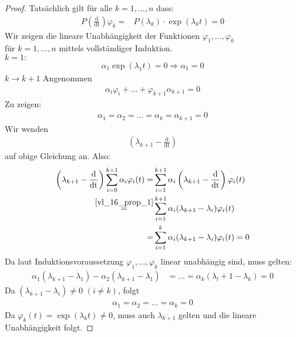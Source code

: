 \begin{proof}
	Tatsächlich gilt für alle $k = 1, \hdots, n $ dass: 
	\begin{align*}
		P \left(\frac{\mathrm{d}}{\mathrm{dt}}\right) \varphi_k = &
			P(\lambda_k)  \cdot \exp(\lambda_k t) = 0
	\end{align*}
	Wir zeigen die lineare Unabhängigkeit der Funktionen $\varphi_1, \hdots, 
	\varphi_k$ \\ für $k = 1, \hdots, n$ mittels vollständiger Induktion. \\
	\emph{$k=1:$} 
	\begin{align*}
		\alpha_1\exp(\lambda_1t) = 0 \Rightarrow \alpha_1 = 0
	\end{align*}
	\emph{$k \rightarrow k+1$} Angenommen
	\begin{align*}
		\alpha_i \varphi_i + \hdots + \varphi_{k+1} \alpha_{k+1} = 0
	\end{align*}
	Zu zeigen: 
	\begin{align*}
		\alpha_1 = \alpha_2 = \hdots = \alpha_k = \alpha_{k+1} = 0
	\end{align*}		
	Wir wenden
	\begin{align*}
		(\lambda_{k+1} - \frac{\mathrm{d}}{\mathrm{dt}})
	\end{align*} auf obige Gleichung an.
	Also: 
	\begin{align*}
		\left(\lambda_{k+1}-\frac{\mathrm{d}}{\mathrm{dt}}\right) 
			\sum_{i=0}^{k+1} \alpha_i \varphi_i(t) 
		= & \sum_{i=1}^{k+1} \alpha_i \left( \lambda_{k+1} - 
			\frac{\mathrm{d}}{\mathrm{dt}} \right) \varphi_i(t) \\ 
		\overset{\ref{vl_16_prop_1}}{=} & \sum_{i=1}^{k+1} \alpha_i (\lambda_{k+1} - \lambda_i) 
			\varphi_i(t) \\
		= & \sum_{i = 1}^k \alpha_i(\lambda_{k+1} - \lambda_i) \varphi_i(t) 
	= 0
	\end{align*}
	Da laut Induktionsvoraussetzung $\varphi_1, \hdots, \varphi_k$ linear 
	unabhängig sind, muss gelten:
	\begin{align*}
		\alpha_1(\lambda_{k+1}-\lambda_1) - \alpha_2(\lambda_{k+1}- \lambda_1)
		& = \hdots = \alpha_k(\lambda_l+1 - \lambda_k ) = 0
	\end{align*}
	Da $(\lambda_{k+1}- \lambda_i) \neq 0$ $(i \neq k)$, folgt 
	\begin{align*}
		\alpha_1 = \alpha_2 = \hdots = \alpha_k = 0
	\end{align*}		
	Da $\varphi_k(t) = \exp(\lambda_k t) \neq 0$, muss auch $\lambda_{k+1}$ 
	gelten und die lineare Unabhängigkeit folgt.
\end{proof}

